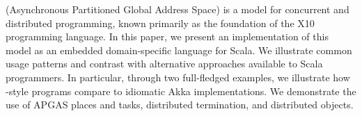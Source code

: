 \apgas (Asynchronous Partitioned Global Address Space) is a model for
concurrent and distributed programming, known primarily as the foundation of
the X10 programming language. In this paper, we present an implementation of
this model as an embedded domain-specific language for Scala. We illustrate
common usage patterns and contrast with alternative approaches available to
Scala programmers. In particular, through two full-fledged examples, we
illustrate how \apgas-style programs compare to idiomatic Akka implementations.
We demonstrate the use of APGAS places and tasks, distributed termination, and distributed objects.
